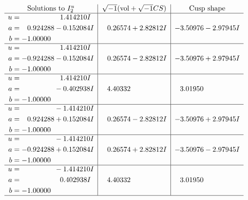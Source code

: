 \documentclass[1p]{elsarticle_modified}
\theoremstyle{definition}
\newcommand{\I}{\sqrt{-1}}
\begin{document}
$$\begin{array}{c|c|c}  
\text{Solutions to }I^u_{2}& \I (\text{vol} + \sqrt{-1}CS) & \text{Cusp shape}\\
 \hline 
\begin{aligned}
u &= \phantom{-0.000000 -}1.414210 I \\
a &= \phantom{-}0.924288 - 0.152084 I \\
b &= -1.00000\phantom{ +0.000000I}\end{aligned}
 & \phantom{-}0.26574 + 2.82812 I & -3.50976 - 2.97945 I \\ \hline\begin{aligned}
u &= \phantom{-0.000000 -}1.414210 I \\
a &= -0.924288 - 0.152084 I \\
b &= -1.00000\phantom{ +0.000000I}\end{aligned}
 & \phantom{-}0.26574 - 2.82812 I & -3.50976 + 2.97945 I \\ \hline\begin{aligned}
u &= \phantom{-0.000000 -}1.414210 I \\
a &= \phantom{-0.000000 } -0.402938 I \\
b &= -1.00000\phantom{ +0.000000I}\end{aligned}
 & \phantom{-}4.40332\phantom{ +0.000000I} & \phantom{-}3.01950\phantom{ +0.000000I} \\ \hline\begin{aligned}
u &= \phantom{-0.000000 } -1.414210 I \\
a &= \phantom{-}0.924288 + 0.152084 I \\
b &= -1.00000\phantom{ +0.000000I}\end{aligned}
 & \phantom{-}0.26574 - 2.82812 I & -3.50976 + 2.97945 I \\ \hline\begin{aligned}
u &= \phantom{-0.000000 } -1.414210 I \\
a &= -0.924288 + 0.152084 I \\
b &= -1.00000\phantom{ +0.000000I}\end{aligned}
 & \phantom{-}0.26574 + 2.82812 I & -3.50976 - 2.97945 I \\ \hline\begin{aligned}
u &= \phantom{-0.000000 } -1.414210 I \\
a &= \phantom{-0.000000 -}0.402938 I \\
b &= -1.00000\phantom{ +0.000000I}\end{aligned}
 & \phantom{-}4.40332\phantom{ +0.000000I} & \phantom{-}3.01950\phantom{ +0.000000I}\\
 \hline 
 \end{array}$$\newpage\newpage\renewcommand{\arraystretch}{1}
\end{document}
